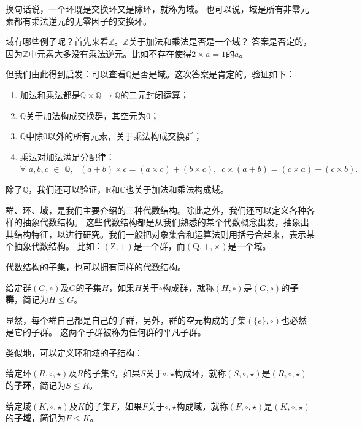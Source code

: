 \documentclass[12pt,UTF8]{ctexbook}
\begin{document}
\begin{appendix}
换句话说，一个环既是交换环又是除环，就称为域。
也可以说，域是所有非零元素都有乘法逆元的无零因子的交换环。

域有哪些例子呢？首先来看$\mathbb{Z}$。$\mathbb{Z}$关于加法和乘法是否是一个域？
答案是否定的，因为$\mathbb{Z}$中元素大多没有乘法逆元。比如不存在使得$2\times a = 1$的$a$。

但我们由此得到启发：可以查看$\mathbb{Q}$是否是域。这次答案是肯定的。验证如下：
\begin{enumerate}
    \item 加法和乘法都是$\mathbb{Q} \times \mathbb{Q} \rightarrow \mathbb{Q}$的二元封闭运算；
    \item $\mathbb{Q}$关于加法构成交换群，其空元为$0$；
    \item $\mathbb{Q}$中除$0$以外的所有元素，关于乘法构成交换群；
    \item 乘法对加法满足分配律：$\forall \,\, a, b, c \,\, \in \,\, \mathbb{Q}, \,\,\,\, (a + b) \times c = (a \times c) + (b \times c), \,\,\, c \times (a + b) = (c \times a) + (c \times b).$
\end{enumerate}

除了$\mathbb{Q}$，我们还可以验证，$\mathbb{R}$和$\mathbb{C}$也关于加法和乘法构成域。

群、环、域，是我们主要介绍的三种代数结构。除此之外，我们还可以定义各种各样的抽象代数结构。
这些代数结构都是从我们熟悉的某个代数概念出发，抽象出其结构特征，以进行研究。我们一般把对象集合和运算法则用括号合起来，表示某个抽象代数结构。
比如：$\left(\mathrm{Z}, +\right)$是一个群，而$\left(\mathrm{Q}, +, \times\right)$是一个域。

代数结构的子集，也可以拥有同样的代数结构。

\begin{df}\label{df:0_3_1}
    给定群$(G, \circ)$及$G$的子集$H$，如果$H$关于$\circ$构成群，就称$(H, \circ)$是$(G, \circ)$的\textbf{子群}，简记为$H\leqslant G$。
\end{df}

显然，每个群自己都是自己的子群，另外，群的空元构成的子集$(\{e\}, \circ)$也必然是它的子群。
这两个子群被称为任何群的平凡子群。

类似地，可以定义环和域的子结构：
\begin{df}\label{df:0_3_2}
    给定环$(R, \circ, \star)$及$R$的子集$S$，如果$S$关于$\circ, \star$构成环，就称$(S, \circ, \star)$是$(R, \circ, \star)$的\textbf{子环}，简记为$S \leqslant R$。
\end{df}

\begin{df}\label{df:0_3_3}
    给定域$(K, \circ, \star)$及$K$的子集$F$，如果$F$关于$\circ, \star$构成域，就称$(F, \circ, \star)$是$(K, \circ, \star)$的\textbf{子域}，简记为$F \leqslant K$。
\end{df}


\end{appendix}
\end{document}
